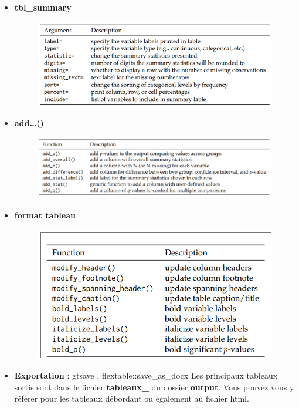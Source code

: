 \documentclass[
]{article}
\providecommand{\tightlist}{%
  \setlength{\itemsep}{0pt}\setlength{\parskip}{0pt}}
\begin{document}
\begin{itemize}
\tightlist
\item
  \textbf{tbl\_summary}

  \begin{figure}
  \includegraphics[width=9.72in]{../img/res_1_} \end{figure}
\item
  \textbf{add\ldots()}

  \begin{figure}
  \includegraphics[width=12.5in]{../img/res_2_} \end{figure}
\item
  \textbf{format tableau}

  \begin{figure}
  \includegraphics[width=11.1in]{../img/res_3} \end{figure}
\item
  \textbf{Exportation} : gtsave , flextable::save\_as\_docx Les
  principaux tableaux sortis sont dans le fichier \textbf{tableaux\_} du
  dossier \textbf{output}. Vous pouvez vous y référer pour les tableaux
  débordant ou également au fichier html.
\end{itemize}
\end{document}
